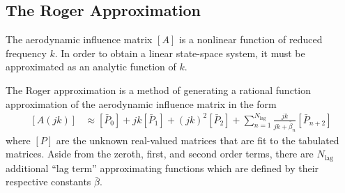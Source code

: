 \subsection{The Roger Approximation}

The aerodynamic influence matrix $[A]$ is a nonlinear function of reduced frequency $k$. In order to obtain a linear state-space system, it must be approximated as an analytic function of $k$.

The Roger approximation \cite{Roger1977} is a method of generating a rational function approximation of the aerodynamic influence matrix in the form
\begin{align}
	\label{eq:RogerApprox}
    [A(jk)] &\approx [\bar{P}_0] + jk [\bar{P}_1] + (jk)^2 [\bar{P}_2] + \sum_{n=1}^{N_\text{lag}} \frac{jk}{jk+\bar{\beta}_n} [\bar{P}_{n+2}]
\end{align}
where $[P]$ are the unknown real-valued matrices that are fit to the tabulated matrices. Aside from the zeroth, first, and second order terms, there are $N_\text{lag}$ additional ``lag term'' approximating functions which are defined by their respective constants $\bar{\beta}$.

